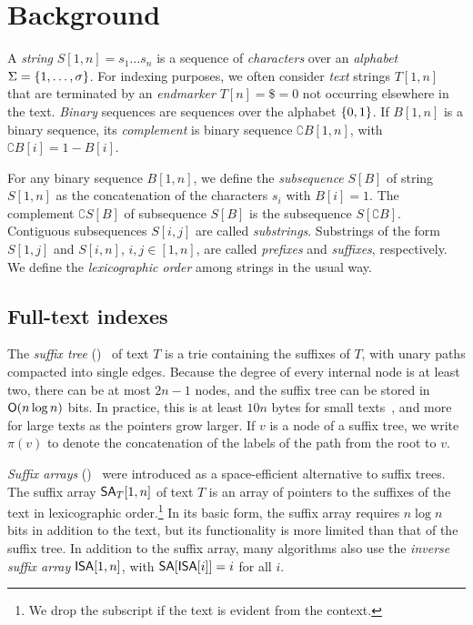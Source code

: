 

\section{Background}

A \emph{string} $S[1,n] = s_{1} \dotso s_{n}$ is a sequence of
\emph{characters} over an \emph{alphabet} $\Sigma = \{ 1, \dotsc, \sigma \}$.
For indexing purposes, we often consider \emph{text} strings $T[1,n]$ that are
terminated by an \emph{endmarker} $T[n] = \$ = 0$ not occurring elsewhere in
the text. \emph{Binary} sequences are sequences over the alphabet $\{ 0,1 \}$.
If $B[1,n]$ is a binary sequence, its \emph{complement} is binary sequence
$\complement{B}[1,n]$, with $\complement{B}[i] = 1 - B[i]$.

For any binary sequence $B[1,n]$, we define the \emph{subsequence} $S[B]$ of
string $S[1,n]$ as the concatenation of the characters $s_{i}$ with $B[i] = 1$.
The complement $\complement{S}[B]$ of subsequence $S[B]$ is the subsequence
$S[\complement{B}]$. Contiguous subsequences $S[i,j]$ are called
\emph{substrings}. Substrings of the form $S[1,j]$ and $S[i,n]$, $i,j \in
[1,n]$, are called \emph{prefixes} and \emph{suffixes}, respectively. We
define the \emph{lexicographic order} among strings in the usual way.

\subsection{Full-text indexes}

The \emph{suffix tree} (\ST)~\cite{Weiner1973} of text $T$ is a trie
containing the suffixes of $T$, with unary paths compacted into single edges.
Because the degree of every internal node is at least two, there can be at most
$2n-1$ nodes, and the suffix tree can be stored in $\mathsf{O}(n \log n)$ bits. In
practice, this is at least $10n$ bytes for small texts~\cite{Kurtz1999}, and
more for large texts as the pointers grow larger. If $v$ is a node of a suffix
tree, we write $\pi(v)$ to denote the concatenation of the labels of the path
from the root to $v$.

\emph{Suffix arrays} (\SA)~\cite{Manber1993} were introduced as a
space-efficient alternative to suffix trees. The suffix array $\mathsf{SA}_{T}[1,n]$ of
text $T$ is an array of pointers to the suffixes of the text in lexicographic
order.\footnote{We drop the subscript if the text is evident from the context.}
In its basic form, the suffix array requires $n \log n$ bits in
addition to the text, but its functionality is more limited than that of the
suffix tree. In addition to the suffix array, many algorithms also use the
\emph{inverse suffix array} $\mathsf{ISA}[1,n]$, with $\mathsf{SA}[\mathsf{ISA}[i]] = i$ for all
$i$.

